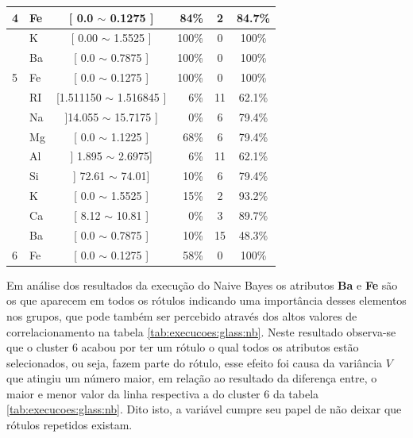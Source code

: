 \begin{table}[!h]
{\begin{tabular}{llcrcc}
\multirow{-5}{*}{4}                          & Fe    & [ 0.0 $\sim$  0.1275 ]    & 84\%  & 2  & 84.7\% \\  \hline                                            
                                            & K     & [ 0.00 $\sim$ 1.5525 ]     & 100\%  & 0 & 100\% \\ 
                                            & Ba     & [ 0.0 $\sim$  0.7875 ]    & 100\%  & 0 & 100\% \\  
\multirow{-3}{*}{5}                         & Fe    & [ 0.0 $\sim$  0.1275 ]     & 100\%  & 0 & 100\% \\  \hline
                                            & RI     & [1.511150 $\sim$  1.516845 ] & 6\%  & 11  & 62.1\% \\ 
                                            & Na     & ]14.055 $\sim$  15.7175 ] & 0\%  & 6  & 79.4\% \\ 
                                             & Mg    & [ 0.0 $\sim$  1.1225 ]    & 68\%  &6  & 79.4\%\\ 
                                             & Al    & ] 1.895 $\sim$  2.6975]      & 6\%  & 11  & 62.1\%\\
                                            & Si    & ] 72.61 $\sim$  74.01]      & 10\%  & 6  & 79.4\%\\
                                            & K     & [  0.0 $\sim$  1.5525 ]    & 15\%  & 2  & 93.2\% \\ 
                                            & Ca     & [ 8.12 $\sim$ 10.81 ]    & 0\%  & 3  & 89.7\% \\ 
                                            & Ba     & [ 0.0 $\sim$  0.7875 ]    & 10\%  & 15  & 48.3\% \\  
\multirow{-3}{*}{6}                         & Fe    & [ 0.0 $\sim$  0.1275 ]     & 58\%  & 0  & 100\% \\  \hline

\end{tabular}
}
\end{table}

Em análise dos resultados da execução do Naive Bayes os atributos \textbf{Ba} e \textbf{Fe} são os que aparecem em todos os rótulos indicando uma importância desses elementos nos grupos, que pode também ser percebido através dos altos valores de correlacionamento na tabela \ref{tab:execucoes:glass:nb}. Neste resultado observa-se que o cluster 6 acabou por ter um rótulo o qual todos os atributos estão selecionados, ou seja, fazem parte do rótulo, esse efeito foi causa da variância ${V}$ que atingiu um número maior, em relação ao resultado da diferença entre, o maior e menor valor  da linha respectiva a do cluster 6 da tabela \ref{tab:execucoes:glass:nb}. Dito isto, a variável cumpre seu papel de não deixar que rótulos repetidos existam.


